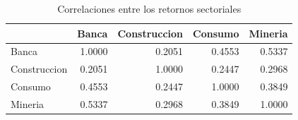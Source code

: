 \begin{table}
\caption{Correlaciones entre los retornos sectoriales}
\label{tab:tabla3_correlaciones}
\begin{tabular}{lrrrr}
\toprule
 & Banca & Construccion & Consumo & Mineria \\
\midrule
Banca & 1.0000 & 0.2051 & 0.4553 & 0.5337 \\
Construccion & 0.2051 & 1.0000 & 0.2447 & 0.2968 \\
Consumo & 0.4553 & 0.2447 & 1.0000 & 0.3849 \\
Mineria & 0.5337 & 0.2968 & 0.3849 & 1.0000 \\
\bottomrule
\end{tabular}
\end{table}
